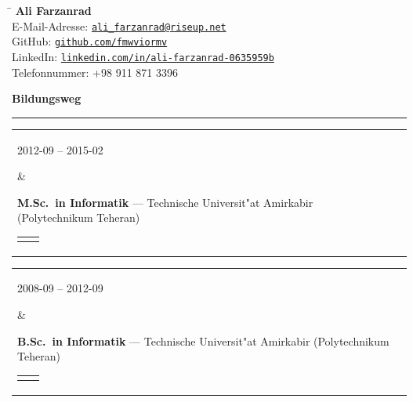 \documentclass[11pt,a4paper,oneside]{article}
\makeatletter
\newcommand{\https}[1]{\href{https://#1}{\nolinkurl{#1}}}
\newcommand{\mailto}[1]{\href{mailto://#1}{\nolinkurl{#1}}}
\newcommand{\follownote}[1]{--- {\footnotesize\color{violet}#1}}
\renewcommand{\section}[1]{%
{\large\textbf{#1}}\\
\rule[9pt]{18cm}{.4pt}\vspace{-15pt}%
}
\newenvironment{mytable}{%
\begin{tabular}{@{}l@{\hspace{4mm}}l@{}}%
}{\end{tabular}}
\newcommand{\myitem}[2]{%
\parbox[t]{16mm}{#1}&\parbox[t]{16cm}{#2}\\%
}
\newenvironment{innertable}{%
\begin{tabular}{@{}l@{\hspace{5mm}}l@{}}%
}{\end{tabular}}
\newcommand{\inneritem}[2]{%
\parbox{35mm}{{\color{darkgray}#1}}&\parbox{12cm}{#2}\\%
}
\makeatother
\begin{document}
%
%
\hspace{1cm}%
\parbox[b]{12cm}{%
\begin{tabbing}%
\hspace{3cm}\=\kill%
\textbf{{\LARGE Ali Farzanrad}}\\[5mm]
E-Mail-Adresse: \>
\mailto{ali_farzanrad@riseup.net}\\[1mm]
GitHub: \>
\https{github.com/fmwviormv}\\[1mm]
LinkedIn: \>
\https{linkedin.com/in/ali-farzanrad-0635959b}\\[1mm]
Telefonnummer: \>
{+}98{ }911{ }871{ }3396\\
\end{tabbing}%
}

\section{Bildungsweg}

\begin{mytable}
\myitem{2012-09 -- 2015-02}{
\textbf{M.Sc.\ in Informatik}
\follownote{Technische Universit"at Amirkabir (Polytechnikum Teheran)}

\begin{innertable}
\inneritem{Hauptfach:}{Intelligente Systeme}
\inneritem{Gpa:}{15{,}07/20}
\inneritem{Abschlussarbeit:}{%
	"`Punkte mit Treppenpolygon abdecken"'}
\inneritem{Supervisor:}{Prof.~Ali~Mohades~Khorasani}
\end{innertable}
}
\end{mytable}

\begin{mytable}
\myitem{2008-09 -- 2012-09}{
\textbf{B.Sc.\ in Informatik}
\follownote{Technische Universit"at Amirkabir (Polytechnikum Teheran)}

\begin{innertable}
\inneritem{Gpa:}{15{,}8/20}
\inneritem{Abschlussarbeit:}{%
	Schnelle Polynomzeitreduktion zwischen vier verschiedenen
	Problemen bei bin"aren quadratischen Gleichungen}
\inneritem{Supervisor:}{Prof.~Mehdi~Ghatee}
\end{innertable}
}
\end{mytable}
\end{document}
